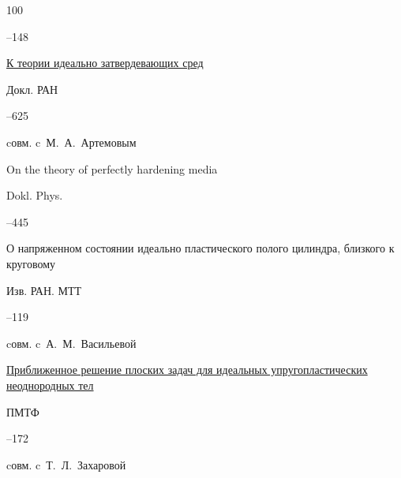 \begin{thebibliography}{100}



--148





\paper \href{https://zbmath.org/?q=an:0935.74020}{К теории идеально затвердевающих сред}

\jour Докл. РАН




–625 


\miscnote cовм. c~М.~А.~Артемовым

\transl

\paper On the theory of perfectly hardening media

\jour Dokl. Phys.




--445






\paper О напряженном состоянии идеально пластического полого цилиндра, близкого к круговому 

\jour Изв. РАН. МТТ



–119 

\miscnote cовм. c~А.~М.~Васильевой




\paper \href{https://zbmath.org/?q=an:0920.73055}{Приближенное решение плоских задач для идеальных упругопластических неоднородных тел}

\jour ПМТФ



–172 

\miscnote cовм. c~Т.~Л.~Захаровой


\end{thebibliography}
